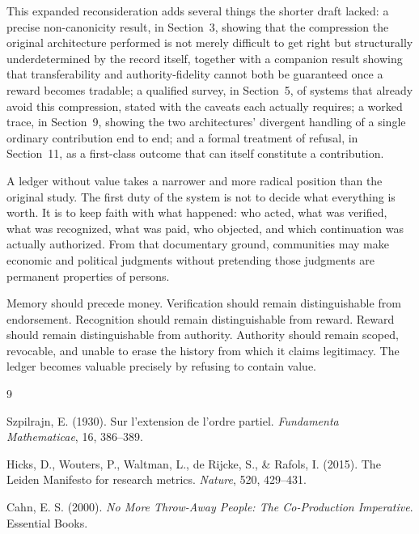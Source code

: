 \documentclass[11pt,oneside]{article}
\theoremstyle{plain}
\theoremstyle{definition}
\begin{document}
This expanded reconsideration adds several things the shorter draft lacked: a precise non-canonicity result, in Section~3, showing that the compression the original architecture performed is not merely difficult to get right but structurally underdetermined by the record itself, together with a companion result showing that transferability and authority-fidelity cannot both be guaranteed once a reward becomes tradable; a qualified survey, in Section~5, of systems that already avoid this compression, stated with the caveats each actually requires; a worked trace, in Section~9, showing the two architectures' divergent handling of a single ordinary contribution end to end; and a formal treatment of refusal, in Section~11, as a first-class outcome that can itself constitute a contribution.

A ledger without value takes a narrower and more radical position than the original study. The first duty of the system is not to decide what everything is worth. It is to keep faith with what happened: who acted, what was verified, what was recognized, what was paid, who objected, and which continuation was actually authorized. From that documentary ground, communities may make economic and political judgments without pretending those judgments are permanent properties of persons.

Memory should precede money. Verification should remain distinguishable from endorsement. Recognition should remain distinguishable from reward. Reward should remain distinguishable from authority. Authority should remain scoped, revocable, and unable to erase the history from which it claims legitimacy. The ledger becomes valuable precisely by refusing to contain value.

\clearpage
\begin{thebibliography}{9}

Szpilrajn, E. (1930).
\newblock Sur l'extension de l'ordre partiel.
\newblock \emph{Fundamenta Mathematicae}, 16, 386--389.

Hicks, D., Wouters, P., Waltman, L., de Rijcke, S., \& Rafols, I. (2015).
\newblock The Leiden Manifesto for research metrics.
\newblock \emph{Nature}, 520, 429--431.

Cahn, E. S. (2000).
\newblock \emph{No More Throw-Away People: The Co-Production Imperative}.
\newblock Essential Books.

\end{thebibliography}
\end{document}
